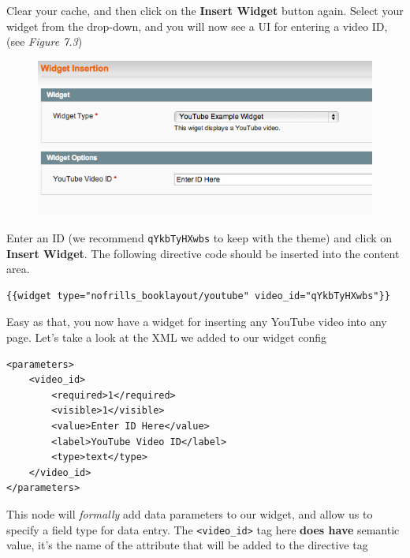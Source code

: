 \documentclass[oneside]{book}
\begin{document}
Clear your cache, and then click on the \textbf{Insert Widget} button again.  Select your widget from the drop-down, and you will now see a UI for entering a video ID, (see \emph{Figure 7.3}) 

\begin{figure}[htb]
\begin{center}
\leavevmode
\includegraphics[width=1\textwidth]{images/chapter7/widget-window-with-data.png}
\end{center}
\caption{}
\end{figure}


Enter an ID (we recommend \footnotesize\texttt{qYkbTyHXwbs} \normalsize  to keep with the theme) and click on \textbf{Insert Widget}.  The following directive code should be inserted into the content area. 

\begin{lstlisting}
{{widget type="nofrills_booklayout/youtube" video_id="qYkbTyHXwbs"}}

\end{lstlisting}


Easy as that, you now have a widget for inserting any YouTube video into any page.  Let's take a look at the XML we added to our widget config

\begin{lstlisting}
<parameters>
    <video_id>
        <required>1</required>
        <visible>1</visible>
        <value>Enter ID Here</value>
        <label>YouTube Video ID</label>
        <type>text</type>
    </video_id>
</parameters>   

\end{lstlisting}


This node will \emph{formally} add data parameters to our widget, and allow us to specify a field type for data entry.  The \footnotesize\texttt{\textless video\_id\textgreater } \normalsize  tag here \textbf{does have} semantic value, it's the name of the attribute that will be added to the directive tag
\end{document}
